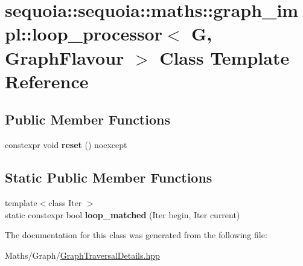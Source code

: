 \hypertarget{classsequoia_1_1sequoia_1_1maths_1_1graph__impl_1_1loop__processor}{}\section{sequoia\+::sequoia\+::maths\+::graph\+\_\+impl\+::loop\+\_\+processor$<$ G, Graph\+Flavour $>$ Class Template Reference}
\label{classsequoia_1_1sequoia_1_1maths_1_1graph__impl_1_1loop__processor}
\subsection*{Public Member Functions}
\begin{DoxyCompactItemize}
\item 
\mbox{\label{classsequoia_1_1sequoia_1_1maths_1_1graph__impl_1_1loop__processor_ab46a3f2b754eb2cd60c5ea469bee83a4}} 
constexpr void {\bfseries reset} () noexcept
\end{DoxyCompactItemize}
\subsection*{Static Public Member Functions}
\begin{DoxyCompactItemize}
\item 
\mbox{\label{classsequoia_1_1sequoia_1_1maths_1_1graph__impl_1_1loop__processor_a7c13d56f652e1864d8daad624ed67d95}} 
{\footnotesize template$<$class Iter $>$ }\\static constexpr bool {\bfseries loop\+\_\+matched} (Iter begin, Iter current)
\end{DoxyCompactItemize}


The documentation for this class was generated from the following file\+:\begin{DoxyCompactItemize}
\item 
Maths/\+Graph/\mbox{\hyperlink{_graph_traversal_details_8hpp}{Graph\+Traversal\+Details.\+hpp}}\end{DoxyCompactItemize}
